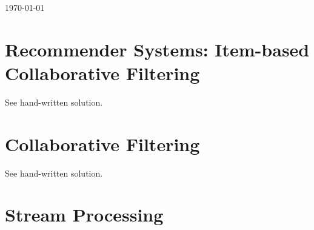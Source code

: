 \documentclass[11pt,a4paper,oneside]{article}
\begin{document}
\begin{titlepage}


{\large \today}\\[3cm] %


\begin{figure}
    
    \def\svgwidth{\columnwidth}
    \scalebox{.2}{
    }
\end{figure}
 

\vfill %

\end{titlepage}


\section{Recommender Systems: Item-based Collaborative Filtering}
See hand-written solution.

\section{Collaborative Filtering}
See hand-written solution.

\section{Stream Processing}
\end{document}
